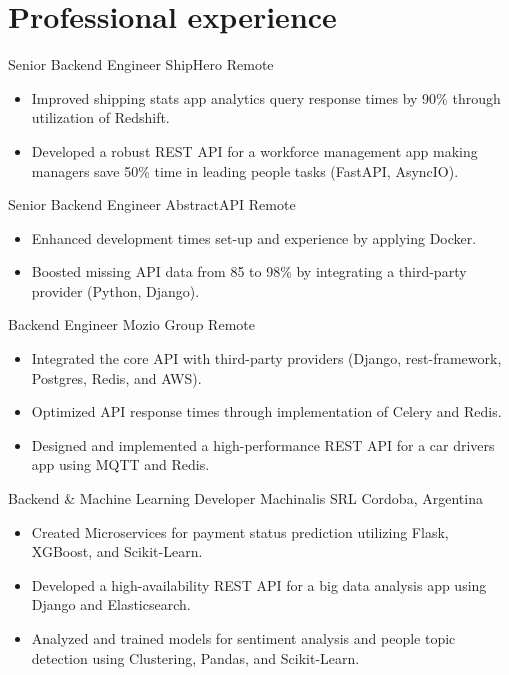 
\section{Professional experience}
    {Senior Backend Engineer} %
    {ShipHero} %
    {Remote} %
    {}
    {
      \begin{itemize} %
        \item {Improved shipping stats app analytics query response times by 90\% through utilization of Redshift.}
        \item {Developed a robust REST API for a workforce management app making managers save 50\% time in leading people tasks (FastAPI, AsyncIO).}
      \end{itemize}
    }
    {Senior Backend Engineer} %
    {AbstractAPI} %
    {Remote} %
    {}
    {
      \begin{itemize}
        \item {Enhanced development times set-up and experience by applying Docker.}
        \item {Boosted missing API data from 85 to 98\% by integrating a third-party provider (Python, Django).}
      \end{itemize}
    }
    {Backend Engineer} %
    {Mozio Group} %
    {Remote} %
    {}
    {
      \begin{itemize} %
        \item {Integrated the core API with third-party providers (Django, rest-framework, Postgres, Redis, and AWS).}
        \item {Optimized API response times through implementation of Celery and Redis.}
        \item {Designed and implemented a high-performance REST API for a car drivers app using MQTT and Redis.}
      \end{itemize}
    }
    {Backend \& Machine Learning Developer} %
    {Machinalis SRL} %
    {Cordoba, Argentina} %
    {}
    {
      \begin{itemize} %
        \item {Created Microservices for payment status prediction utilizing Flask, XGBoost, and Scikit-Learn.}
        \item {Developed a high-availability REST API for a big data analysis app using Django and Elasticsearch.}
        \item {Analyzed and trained models for sentiment analysis and people topic detection using Clustering, Pandas, and Scikit-Learn.}
      \end{itemize}
    }

